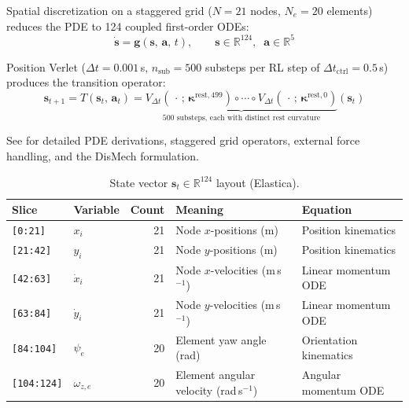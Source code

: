 \documentclass[11pt]{article}
\begin{document}
Spatial discretization on a staggered grid ($N{=}21$ nodes, $N_e{=}20$ elements) reduces the PDE to 124 coupled first-order ODEs:
\begin{equation}
  \dot{\mathbf{s}} = \mathbf{g}(\mathbf{s},\, \mathbf{a},\, t), \qquad
  \mathbf{s} \in \mathbb{R}^{124},\;\; \mathbf{a} \in \mathbb{R}^{5}
  \label{eq:ode-system}
\end{equation}

Position Verlet ($\Delta t = 0.001$\,s, $n_{\text{sub}} = 500$ substeps per RL step of $\Delta t_{\text{ctrl}} = 0.5$\,s) produces the transition operator:
\begin{equation}
  \mathbf{s}_{t+1} = T(\mathbf{s}_t,\, \mathbf{a}_t)
    = \underbrace{V_{\Delta t}(\,\cdot\,;\, \boldsymbol{\kappa}^{\text{rest},499}) \circ \cdots \circ V_{\Delta t}(\,\cdot\,;\, \boldsymbol{\kappa}^{\text{rest},0})}_{500 \text{ substeps, each with distinct rest curvature}}(\mathbf{s}_t)
  \label{eq:transition-operator}
\end{equation}

See  for detailed PDE derivations, staggered grid operators, external force handling, and the DisMech formulation.

\begin{table}[H]
  \centering
  \small
  \caption{State vector $\mathbf{s}_t \in \mathbb{R}^{124}$ layout (Elastica).}
  \label{tab:state-vector}
  \begin{tabular}{llrll}
    \toprule
    Slice & Variable & Count & Meaning & Equation \\
    \midrule
    \texttt{[0:21]}    & $x_i$          & 21 & Node $x$-positions (m)                   & Position kinematics \\
    \texttt{[21:42]}   & $y_i$          & 21 & Node $y$-positions (m)                   & Position kinematics \\
    \texttt{[42:63]}   & $\dot{x}_i$    & 21 & Node $x$-velocities (m\,s$^{-1}$)       & Linear momentum ODE \\
    \texttt{[63:84]}   & $\dot{y}_i$    & 21 & Node $y$-velocities (m\,s$^{-1}$)       & Linear momentum ODE \\
    \texttt{[84:104]}  & $\psi_e$       & 20 & Element yaw angle (rad)                  & Orientation kinematics \\
    \texttt{[104:124]} & $\omega_{z,e}$ & 20 & Element angular velocity (rad\,s$^{-1}$) & Angular momentum ODE \\
    \bottomrule
  \end{tabular}
\end{table}
\end{document}
